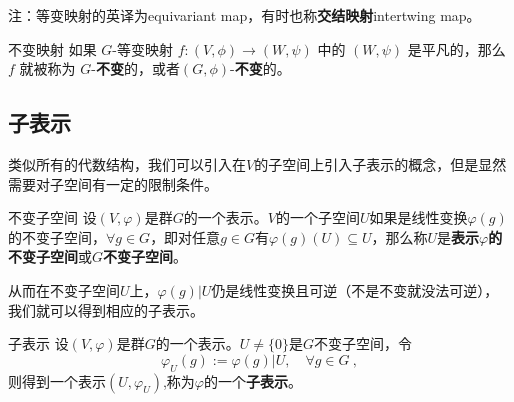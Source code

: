 注：等变映射的英译为equivariant map，有时也称\textbf{交结映射}intertwing map。

\begin{definition}{不变映射}
如果 $G$-等变映射 $f: (V, \phi) \to (W, \psi)$ 中的 $(W, \psi)$ 是平凡的，那么 $f$ 就被称为 $G$-\textbf{不变}的，或者$(G, \phi)$-\textbf{不变}的。
\end{definition}


\subsection{子表示}



类似所有的代数结构，我们可以引入在$V$的子空间上引入子表示的概念，但是显然需要对子空间有一定的限制条件。

\begin{definition}{不变子空间}
设$(V,\varphi)$是群$G$的一个表示。$V$的一个子空间$U$如果是线性变换$\varphi(g)$的不变子空间，$\forall g\in G$，即对任意$g\in G$有$\varphi(g)(U)\subseteq U$，那么称$U$是\textbf{表示$\varphi$的不变子空间}或\textbf{$G$不变子空间}。
\end{definition}

从而在不变子空间$U$上，$\varphi(g)|U$仍是线性变换且可逆（不是不变就没法可逆），我们就可以得到相应的子表示。

\begin{definition}{子表示}
设$(V,\varphi)$是群$G$的一个表示。$U\neq\{0\}$是$G$不变子空间，令
\begin{equation}
\varphi_U(g) := \varphi(g)|U,\quad\forall g\in G~,
\end{equation}
则得到一个表示$(U,\varphi_U)$,称为$\varphi$的一个\textbf{子表示}。
\end{definition}
